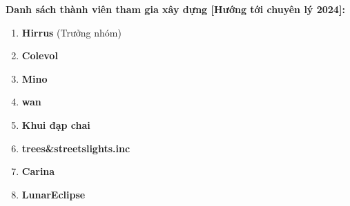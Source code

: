 { \normalcolor \textbf{Danh sách thành viên tham gia xây dựng [Hướng tới chuyên lý 2024]:}} \\ \vspace{0.5cm}

\begin{enumerate}
    \item \textbf{Hirrus} (Trưởng nhóm)
    \item \textbf{Colevol}
    \item \textbf{Mino}
    \item \textbf{wan}
    \item \textbf{Khui đạp chai}
    \item \textbf{trees\&streetslights.inc}
    \item \textbf{Carina}
    \item \textbf{LunarEclipse}
\end{enumerate}


